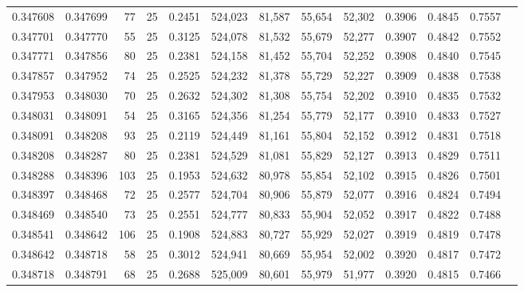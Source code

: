 \begin{tabular}{rrrrrrrrrrrrr}
0.347608 & 0.347699 &    77 &  25 &                                     0.2451 & 524,023 &  81,587 &  55,654 &  52,302 & 0.3906 & 0.4845 & 0.7557 \\
0.347701 & 0.347770 &    55 &  25 &                                     0.3125 & 524,078 &  81,532 &  55,679 &  52,277 & 0.3907 & 0.4842 & 0.7552 \\
0.347771 & 0.347856 &    80 &  25 &                                     0.2381 & 524,158 &  81,452 &  55,704 &  52,252 & 0.3908 & 0.4840 & 0.7545 \\
0.347857 & 0.347952 &    74 &  25 &                                     0.2525 & 524,232 &  81,378 &  55,729 &  52,227 & 0.3909 & 0.4838 & 0.7538 \\
0.347953 & 0.348030 &    70 &  25 &                                     0.2632 & 524,302 &  81,308 &  55,754 &  52,202 & 0.3910 & 0.4835 & 0.7532 \\
0.348031 & 0.348091 &    54 &  25 &                                     0.3165 & 524,356 &  81,254 &  55,779 &  52,177 & 0.3910 & 0.4833 & 0.7527 \\
0.348091 & 0.348208 &    93 &  25 &                                     0.2119 & 524,449 &  81,161 &  55,804 &  52,152 & 0.3912 & 0.4831 & 0.7518 \\
0.348208 & 0.348287 &    80 &  25 &                                     0.2381 & 524,529 &  81,081 &  55,829 &  52,127 & 0.3913 & 0.4829 & 0.7511 \\
0.348288 & 0.348396 &   103 &  25 &                                     0.1953 & 524,632 &  80,978 &  55,854 &  52,102 & 0.3915 & 0.4826 & 0.7501 \\
0.348397 & 0.348468 &    72 &  25 &                                     0.2577 & 524,704 &  80,906 &  55,879 &  52,077 & 0.3916 & 0.4824 & 0.7494 \\
0.348469 & 0.348540 &    73 &  25 &                                     0.2551 & 524,777 &  80,833 &  55,904 &  52,052 & 0.3917 & 0.4822 & 0.7488 \\
0.348541 & 0.348642 &   106 &  25 &                                     0.1908 & 524,883 &  80,727 &  55,929 &  52,027 & 0.3919 & 0.4819 & 0.7478 \\
0.348642 & 0.348718 &    58 &  25 &                                     0.3012 & 524,941 &  80,669 &  55,954 &  52,002 & 0.3920 & 0.4817 & 0.7472 \\
0.348718 & 0.348791 &    68 &  25 &                                     0.2688 & 525,009 &  80,601 &  55,979 &  51,977 & 0.3920 & 0.4815 & 0.7466 \\

\end{tabular}

